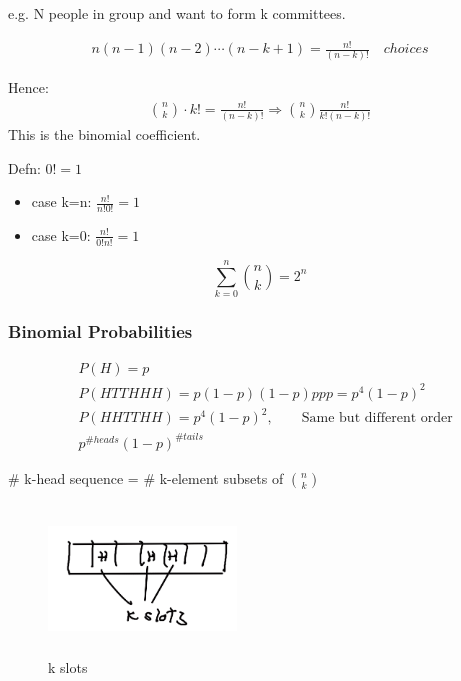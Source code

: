 \documentclass{article}
\begin{document}
e.g. N people in group and want to form k committees.

\begin{align*}
n(n-1)(n-2)\cdots (n-k+1)=\frac{n!}{(n-k)!} \quad choices
\end{align*}


Hence:
\begin{align*}
{n \choose k}\cdot k! = \frac{n!}{(n-k)!} \Rightarrow {n \choose k} \frac{n!}{k!(n-k)!}
\end{align*}
This is the binomial coefficient.


Defn: $0! = 1$

\begin{itemize}
    \item case k=n: $\frac{n!}{n!0!}=1$
    \item case k=0: $\frac{n!}{0!n!}=1$ 
\end{itemize}



$$\sum_{k=0}^n {n \choose k} = 2^n$$ 

\subsubsection{Binomial Probabilities}


\begin{align*}
&P(H)=p\\
&P(HTTHHH)=p(1-p)(1-p)ppp = p^4(1-p)^2\\
&P(HHTTHH)= p^4(1-p)^2, \qquad \text{Same but different order}\\
&p^{\#heads}(1-p)^{\#tails}
\end{align*}


\# k-head sequence = \# k-element subsets of ${n \choose k}$

\begin{figure}[h]
\centering
\includegraphics[width=5cm, height=4cm]{images/L04/k_slots.jpeg}
\caption{k slots}
\end{figure}
\end{document}
